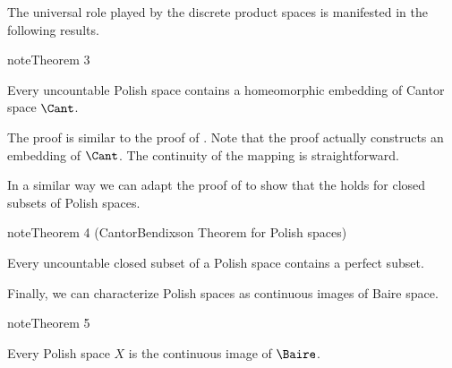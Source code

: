 \documentclass[letterpaper,10pt,english]{jupyterBook}
\begin{document}
\sphinxAtStartPar
The universal role played by the discrete product spaces is manifested in the following results.
\label{polish:thm-Cantor-embedding}
\begin{sphinxadmonition}{note}{Theorem 3}



\sphinxAtStartPar
Every uncountable Polish space contains a homeomorphic embedding of Cantor space \(\Cant\).
\end{sphinxadmonition}

\sphinxAtStartPar
The proof is similar to the proof of {\hyperref[\detokenize{perfect_subsets_R:thm-card-perfect-sets}]{}}. Note that the proof actually constructs an embedding of \(\Cant\). The continuity of the mapping is straightforward.

\sphinxAtStartPar
In a similar way we can adapt the proof of {\hyperref[\detokenize{perfect_subsets_R:cantor-bendixson}]{}} to show that the  holds for closed subsets of Polish spaces.
\label{polish:thm-cantor_bendixson-polish}
\begin{sphinxadmonition}{note}{Theorem 4 (Cantor\sphinxhyphen{}Bendixson Theorem for Polish spaces)}



\sphinxAtStartPar
Every uncountable closed subset of a Polish space contains a perfect subset.
\end{sphinxadmonition}

\sphinxAtStartPar
Finally, we can characterize Polish spaces as continuous images of Baire space.
\label{polish:thm-polish-cont-image-Baire}
\begin{sphinxadmonition}{note}{Theorem 5}



\sphinxAtStartPar
Every Polish space \(X\) is the continuous image of \(\Baire\).
\end{sphinxadmonition}
\end{document}
